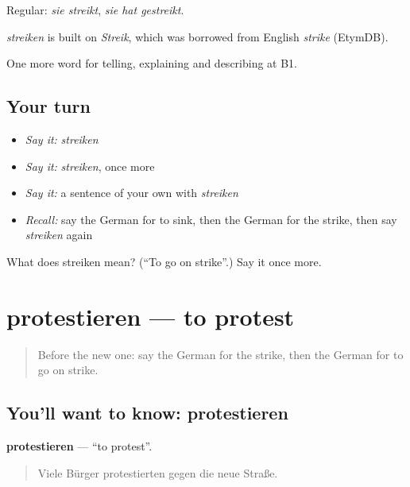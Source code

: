 Regular: \emph{sie streikt}, \emph{sie hat gestreikt}.

\begin{cousinweb}
\emph{streiken} is built on \emph{Streik}, which was borrowed from English \emph{strike} (EtymDB).
\end{cousinweb}

\begin{grammarlens}[title={What you've built}]
One more word for telling, explaining and describing at B1.
\end{grammarlens}

\subsection*{Your turn}
\begin{itemize}
\raggedright
  \item \emph{Say it:} \emph{streiken}
  \item \emph{Say it:} \emph{streiken}, once more
  \item \emph{Say it:} a sentence of your own with \emph{streiken}
  \item \emph{Recall:} say the German for to sink, then the German for the strike, then say \emph{streiken} again
\end{itemize}

\begin{tcolorbox}[breakable,colback=teal!4,colframe=teal!35!black,title={Before you move on}]
What does streiken mean? (\textquotedblleft{}To go on strike\textquotedblright{}.) Say it once more.
\end{tcolorbox}
\section[protestieren]{protestieren — to protest}

\label{lesson:GE-C277-protestieren}



\begin{quote}
Before the new one: say the German for the strike, then the German for to go on strike.
\end{quote}

\subsection*{You'll want to know: protestieren}
\textbf{protestieren} — \textquotedblleft{}to protest\textquotedblright{}.

\begin{quote}
Viele Bürger protestierten gegen die neue Straße.
\end{quote}


